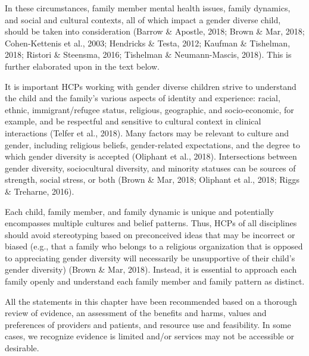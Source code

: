 \documentclass[
]{book}
\begin{document}
In these circumstances, family member mental
health issues, family dynamics, and social and cultural contexts, all of which impact a gender diverse
child, should be taken into consideration (Barrow
\& Apostle, 2018; Brown \& Mar, 2018; Cohen-Kettenis
et al., 2003; Hendricks \& Testa, 2012; Kaufman \&
Tishelman, 2018; Ristori \& Steensma, 2016;
Tishelman \& Neumann-Mascis, 2018). This is further elaborated upon in the text below.

It is important HCPs working with gender
diverse children strive to understand the child and
the family's various aspects of identity and experience: racial, ethnic, immigrant/refugee status,
religious, geographic, and socio-economic, for
example, and be respectful and sensitive to cultural
context in clinical interactions (Telfer et al., 2018).
Many factors may be relevant to culture and gender, including religious beliefs, gender-related
expectations, and the degree to which gender
diversity is accepted (Oliphant et al., 2018).
Intersections between gender diversity, sociocultural diversity, and minority statuses can be sources
of strength, social stress, or both (Brown \& Mar,
2018; Oliphant et al., 2018; Riggs \& Treharne, 2016).

Each child, family member, and family dynamic
is unique and potentially encompasses multiple
cultures and belief patterns. Thus, HCPs of all
disciplines should avoid stereotyping based on
preconceived ideas that may be incorrect or
biased (e.g., that a family who belongs to a religious organization that is opposed to appreciating
gender diversity will necessarily be unsupportive
of their child's gender diversity) (Brown \& Mar,
2018). Instead, it is essential to approach each
family openly and understand each family member and family pattern as distinct.

All the statements in this chapter have been
recommended based on a thorough review of
evidence, an assessment of the benefits and
harms, values and preferences of providers and
patients, and resource use and feasibility. In some
cases, we recognize evidence is limited and/or
services may not be accessible or desirable.
\end{document}
